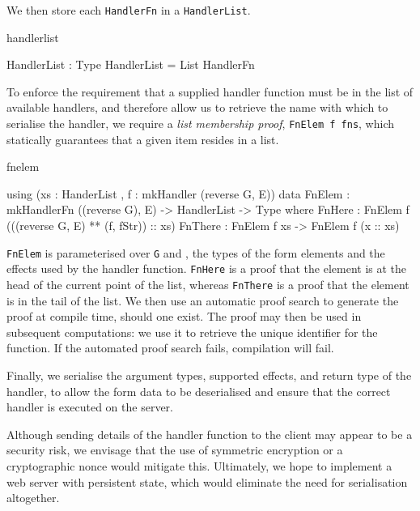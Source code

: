 \noindent
We then store each \texttt{HandlerFn} in a \texttt{HandlerList}.

\begin{SaveVerbatim}{handlerlist}

HandlerList : Type
HandlerList = List HandlerFn

\end{SaveVerbatim}

To enforce the requirement that a supplied handler function must be in the
list of available handlers, and therefore allow us to retrieve the name with
which to serialise the handler, we require a \textit{list membership proof},
\texttt{FnElem f fns}, which statically guarantees that a given item resides in
a list.

\begin{SaveVerbatim}{fnelem}

using (xs : HanderList , f : mkHandler (reverse G, E))
  data FnElem : mkHandlerFn ((reverse G), E) -> 
                HandlerList -> Type where
       FnHere  : FnElem f (((reverse G, E) ** 
                                  (f, fStr)) :: xs)
       FnThere : FnElem f xs -> FnElem f (x :: xs)

\end{SaveVerbatim}

\noindent
\texttt{FnElem} is parameterised over \texttt{G} and , the types of the
form elements and the effects used by the handler function. \texttt{FnHere}
is a proof that the element is at the head of the current point of the list,
whereas \texttt{FnThere} is a proof that the element is in the tail of 
the list. 
We then use an automatic proof search to
generate the proof at compile time, should one exist. The proof
may then be used in subsequent computations: we use it to retrieve
the unique identifier for the function. If the automated proof search fails,
compilation will fail.

Finally, we serialise the argument types, supported effects, and return
type of the handler, to allow the form data to be 
deserialised and ensure that the correct handler is executed on the
server. 

Although sending details of the handler function to the client may appear to be
a security risk, we envisage that the use of symmetric encryption or a
cryptographic nonce would mitigate this. Ultimately, we hope to implement a
web server with persistent state, which would eliminate the need for
serialisation altogether.

